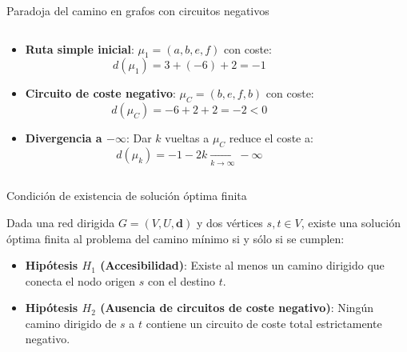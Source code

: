\documentclass[
  ignorenonframetext,
]{beamer}
\begin{document}
\begin{frame}{Paradoja del camino en grafos con circuitos negativos}
\label{paradoja-del-camino-en-grafos-con-circuitos-negativos}
\begin{columns}[T]
\begin{column}{0.5\linewidth}
\begin{itemize}
\item
  \textbf{Ruta simple inicial}: \(\mu_1 = (a, b, e, f)\) con coste:
  \[d(\mu_1) = 3 + (-6) + 2 = -1\]
\item
  \textbf{Circuito de coste negativo}: \(\mu_C = (b, e, f, b)\) con
  coste: \[d(\mu_C) = -6 + 2 + 2 = -2 < 0\]
\item
  \textbf{Divergencia a \(-\infty\)}: Dar \(k\) vueltas a \(\mu_C\)
  reduce el coste a:
  \[d(\mu_k) = -1 - 2k \xrightarrow[k \to \infty]{} -\infty\]
\end{itemize}
\end{column}

\begin{column}{0.5\linewidth}
\end{column}
\end{columns}
\end{frame}

\begin{frame}{Condición de existencia de solución óptima finita}
\label{condiciuxf3n-de-existencia-de-soluciuxf3n-uxf3ptima-finita}
\begin{tcolorbox}[enhanced jigsaw, colframe=quarto-callout-important-color-frame, toptitle=1mm, colback=white, colbacktitle=quarto-callout-important-color!10!white, titlerule=0mm, breakable, coltitle=black, opacityback=0, bottomrule=.15mm, title=\textcolor{quarto-callout-important-color}{\faExclamation}\hspace{0.5em}{Condición de existencia de solución óptima finita}, rightrule=.15mm, arc=.35mm, leftrule=.75mm, left=2mm, toprule=.15mm, bottomtitle=1mm, opacitybacktitle=0.6]

Dada una red dirigida \(G = (V, U, \mathbf{d})\) y dos vértices
\(s, t \in V\), existe una solución óptima finita al problema del camino
mínimo si y sólo si se cumplen:

\begin{itemize}
\item
  \textbf{Hipótesis \(H_1\) (Accesibilidad)}: Existe al menos un camino
  dirigido que conecta el nodo origen \(s\) con el destino \(t\).
\item
  \textbf{Hipótesis \(H_2\) (Ausencia de circuitos de coste negativo)}:
  Ningún camino dirigido de \(s\) a \(t\) contiene un circuito de coste
  total estrictamente negativo.
\end{itemize}

\end{tcolorbox}
\end{frame}
\end{document}
